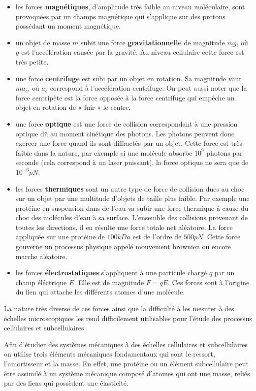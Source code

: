 \documentclass[12pt,a4paper,twoside,openright]{book}
\begin{document}
\begin{itemize}
\item
  les forces \textbf{magnétiques}, d'amplitude très faible au niveau
  moléculaire, sont provoquées par un champs magnétique qui s'applique
  sur des protons possédant un moment magnétique.
\item
  un objet de masse \(m\) subit une force \textbf{gravitationnelle} de
  magnitude \(mg\), où \(g\) est l'accélération causée par la gravité.
  Au niveau cellulaire cette force est très petite.
\item
  une force \textbf{centrifuge} est subi par un objet en rotation. Sa
  magnitude vaut \(ma_c\), où \(a_c\) correspond à l'accélération
  centrifuge. On peut aussi noter que la force centripète est la force
  opposée à la force centrifuge qui empêche un objet en rotation de «
  fuir » le centre.
\item
  une force \textbf{optique} est une force de collision correspondant à
  une pression optique dû au moment cinétique des photons. Les photons
  peuvent donc exercer une force quand ils sont diffractés par un objet.
  Cette force est très faible dans la nature, par exemple si une
  molécule absorbe \(10^9\) photons par seconde (cela correspond à un
  laser puissant), la force optique ne sera que de \(10^{-6}pN\).
\item
  les forces \textbf{thermiques} sont un autre type de force de
  collision dues au choc sur un objet par une multitude d'objets de
  taille plus faible. Par exemple une protéine en suspension dans de
  l'eau va subir une force thermique à cause du choc des molécules d'eau
  à sa surface. L'ensemble des collisions provenant de toutes les
  directions, il en résulte une force totale net aléatoire. La force
  appliquée sur une protéine de \(100kDa\) est de l'ordre de \(500pN\).
  Cette force gouverne un processus physique appelé mouvement brownien
  ou encore marche aléatoire.
\item
  les forces \textbf{électrostatiques} s'appliquent à une particule
  chargé \(q\) par un champ éléctrique \(E\). Elle est de magnitude
  \(F = qE\). Ces forces sont à l'origine du lien qui attache les
  différents atomes d'une molécule.
\end{itemize}

La nature très diverse de ces forces ainsi que la difficulté à les
mesurer à des échelles microscopiques les rend difficilement utilisables
pour l'étude des processus cellulaires et subcellulaires.

Afin d'étudier des systèmes mécaniques à des échelles cellulaires et
subcellulaires on utilise trois éléments mécaniques fondamentaux qui
sont le ressort, l'amortisseur et la masse. En effet, une protéine ou un
élément subcellulaire peut être assimilé à un système mécanique composé
d'atomes qui ont une masse, reliés par des liens qui possèdent une
élasticité.
\end{document}
